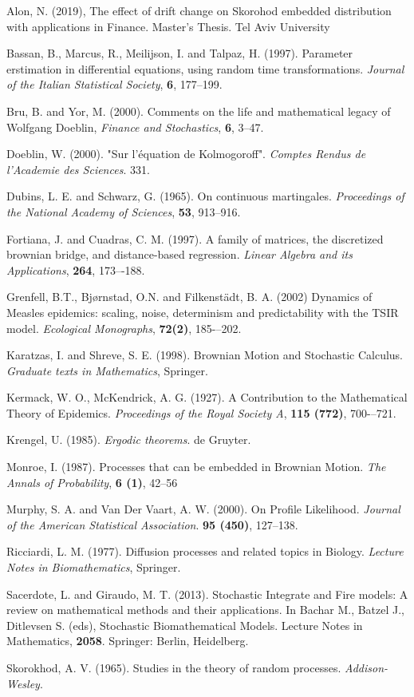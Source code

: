 \documentclass{article}
\begin{document}
\begin{thebibliography}{99}

 Alon, N. (2019), The effect of drift change on Skorohod embedded distribution with applications in Finance. Master’s Thesis. Tel Aviv
University

 Bassan, B., Marcus, R., Meilijson, I. and Talpaz, H. (1997). Parameter erstimation in differential equations, using random time transformations. {\em Journal of the Italian Statistical Society}, {\bf 6}, 177--199.

 Bru, B. and Yor, M. (2000). Comments on the life and mathematical legacy of Wolfgang Doeblin, {\em Finance and Stochastics}, {\bf 6}, 3–47.

 Doeblin, W. (2000). "Sur l'équation de Kolmogoroff". {\em Comptes Rendus de l'Academie des Sciences}. 331.

  Dubins, L. E. and Schwarz, G. (1965). On continuous martingales. {\em Proceedings of the National Academy of Sciences}, {\bf 53}, 913–916.

 Fortiana, J. and Cuadras, C. M. (1997). A family of matrices, the discretized brownian bridge, and distance-based regression. {\em Linear
Algebra and its Applications}, {\bf 264}, 173–-188.

 Grenfell, B.T., Bj{\o}rnstad, O.N. and Filkenst\"{a}dt, B. A. (2002) Dynamics of Measles epidemics: scaling, noise, determinism and predictability with the TSIR model. {\em Ecological Monographs}, {\bf 72(2)}, 185-–202.

 Karatzas, I. and Shreve, S. E. (1998). Brownian Motion and Stochastic Calculus. {\em Graduate texts in Mathematics}, Springer.

  Kermack, W. O., McKendrick, A. G. (1927). A Contribution to the Mathematical Theory of Epidemics. {\em Proceedings of the Royal Society A}, {\bf 115 (772)}, 700-–721.

 Krengel, U. (1985). {\em Ergodic theorems}. de Gruyter.

 Monroe, I. (1987). Processes that can be embedded in Brownian Motion.
{\em The Annals of Probability}, {\bf 6 (1)}, 42--56

 Murphy, S. A. and  Van Der Vaart, A. W. (2000). On Profile Likelihood. {\em Journal of the American Statistical Association}. {\bf 95 (450)}, 127--138.

 Ricciardi, L. M. (1977). Diffusion processes and related topics in Biology. {\em Lecture Notes in Biomathematics}, Springer.

 Sacerdote, L. and Giraudo, M. T. (2013). Stochastic Integrate and Fire models: A review on mathematical methods and their applications. In Bachar M., Batzel J., Ditlevsen S. (eds), Stochastic Biomathematical Models. Lecture Notes in Mathematics, {\bf 2058}. Springer: Berlin, Heidelberg.

 Skorokhod, A. V. (1965). Studies in the theory of random  processes. {\em Addison-Wesley}.

\end{thebibliography}
\end{document}
